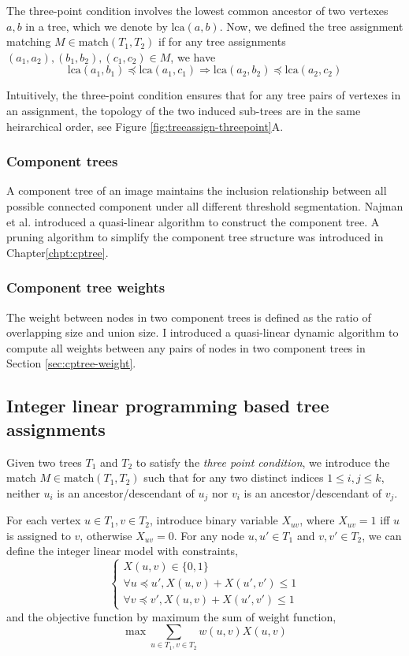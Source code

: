 The three-point condition involves the lowest common ancestor of two vertexes $a,b$ in a tree, which we denote by $\mathrm{lca}(a,b)$. Now, we defined the tree assignment matching $M \in \mathrm{match}(T_1,T_2)$ if for any tree assignments $(a_1,a_2),(b_1,b_2),(c_1,c_2) \in M$, we have
$$
\mathrm{lca}(a_1,b_1) \preceq \mathrm{lca}(a_1,c_1)  \Rightarrow \mathrm{lca}(a_2,b_2) \preceq \mathrm{lca}(a_2,c_2)
$$

Intuitively, the three-point condition ensures that for any tree pairs of vertexes in an assignment, the topology of the two induced sub-trees are in the same heirarchical order, see Figure \ref{fig:treeassign-threepoint}A.  
\subsubsection{Component trees}
A component tree of an image maintains the inclusion relationship between all possible connected component under all different threshold segmentation. Najman et al.\cite{Najman:04} introduced a quasi-linear algorithm to construct the component tree. A pruning algorithm to simplify the component tree structure was introduced in Chapter\ref{chpt:cptree}.

\subsubsection{Component tree weights}
The weight between nodes in two component trees is defined as the ratio of overlapping size and union size. I introduced a quasi-linear dynamic algorithm to compute all weights between any pairs of nodes in two component trees in Section \ref{sec:cptree-weight}.
\subsection{Integer linear programming based tree assignments}
Given two trees $T_1$ and $T_2$ to satisfy the \emph{three point condition}, we introduce the match $M \in \mathrm{match}(T_1,T_2)$ such that for any two distinct indices $1 \le i,j \le k$, neither $u_i$ is an ancestor/descendant of $u_j$ nor $v_i$ is an ancestor/descendant of $v_j$. 

For each vertex $u \in T_1, v \in T_2$, introduce binary variable $X_{uv}$, where $X_{uv} = 1$ iff $u$ is assigned to $v$, otherwise $X_{uv} = 0$. For any node $u, u' \in T_1$ and $v, v' \in T_2$, we can define the integer linear model with constraints,
\begin{equation}
\label{eqn:cptree-ilp-st}
\left\{
\begin{array}{l}
X(u,v) \in \{0,1\} \\
\forall u \preceq u', X(u,v) + X(u',v') \le 1 \\
\forall v \preceq v', X(u,v) + X(u',v') \le 1 
\end{array}
\right.
\end{equation}
and the objective function by maximum the sum of weight function,
\begin{equation}
 \max \sum_{u\in T_1, v \in T_2} w(u,v)X(u,v)
\end{equation}

